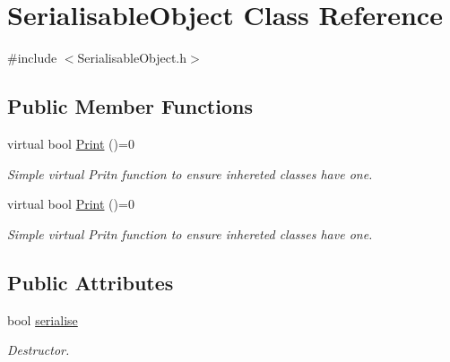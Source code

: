 \hypertarget{classSerialisableObject}{\section{Serialisable\-Object Class Reference}
\label{classSerialisableObject}
}


{\ttfamily \#include $<$Serialisable\-Object.\-h$>$}

\subsection*{Public Member Functions}
\begin{DoxyCompactItemize}
\item 
\hypertarget{classSerialisableObject_a9055c98969917d4c652eefdc924b6b75}{virtual bool \hyperlink{classSerialisableObject_a9055c98969917d4c652eefdc924b6b75}{Print} ()=0}\label{classSerialisableObject_a9055c98969917d4c652eefdc924b6b75}

\begin{DoxyCompactList}\small\item\em Simple virtual Pritn function to ensure inhereted classes have one. \end{DoxyCompactList}\item 
\hypertarget{classSerialisableObject_a9055c98969917d4c652eefdc924b6b75}{virtual bool \hyperlink{classSerialisableObject_a9055c98969917d4c652eefdc924b6b75}{Print} ()=0}\label{classSerialisableObject_a9055c98969917d4c652eefdc924b6b75}

\begin{DoxyCompactList}\small\item\em Simple virtual Pritn function to ensure inhereted classes have one. \end{DoxyCompactList}\end{DoxyCompactItemize}
\subsection*{Public Attributes}
\begin{DoxyCompactItemize}
\item 
bool \hyperlink{classSerialisableObject_a4635f9e80623df463bcca2c88b10fc67}{serialise}
\begin{DoxyCompactList}\small\item\em Destructor. \end{DoxyCompactList}\end{DoxyCompactItemize}
